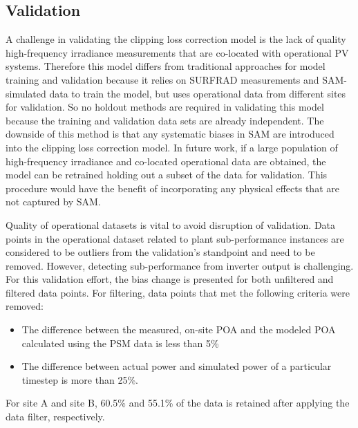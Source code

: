 \documentclass[conference]{IEEEtran}
\begin{document}
\subsection{Validation}
A challenge in validating the clipping loss correction model is the lack of quality high-frequency irradiance measurements that are co-located with operational PV systems. Therefore this model differs from traditional approaches for model training and validation because it relies on SURFRAD measurements and SAM-simulated data to train the model, but uses operational data from different sites for validation. So no holdout methods are required in validating this model because the training and validation data sets are already independent. The downside of this method is that any systematic biases in SAM are introduced into the clipping loss correction model. In future work, if a large population of high-frequency irradiance and co-located operational data are obtained, the model can be retrained holding out a subset of the data for validation. This procedure would have the benefit of incorporating any physical effects that are not captured by SAM.

Quality of operational datasets is vital to avoid disruption of validation. Data points in the operational dataset related to plant sub-performance instances are considered to be outliers from the validation's standpoint and need to be removed. However, detecting sub-performance from inverter output is challenging. For this validation effort, the bias change is presented for both unfiltered and filtered data points. For filtering, data points that met the following criteria were removed: 
\begin{itemize}
\item The difference between the measured, on-site POA and the modeled POA calculated using the PSM data is less than 5\% 
\item The difference between actual power and simulated power of a particular timestep is more than 25\%. 
\end{itemize}
For site A and site B, 60.5\% and 55.1\% of the data is retained after applying the data filter, respectively.
\end{document}
